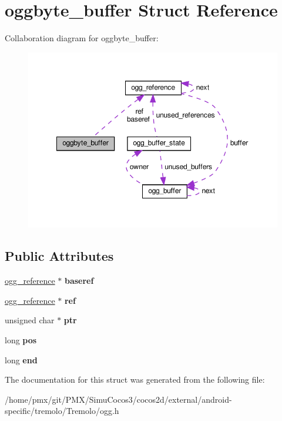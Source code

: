\hypertarget{structoggbyte__buffer}{}\section{oggbyte\+\_\+buffer Struct Reference}
\label{structoggbyte__buffer}


Collaboration diagram for oggbyte\+\_\+buffer\+:
\nopagebreak
\begin{figure}[H]
\begin{center}
\leavevmode
\includegraphics[width=349pt]{structoggbyte__buffer__coll__graph}
\end{center}
\end{figure}
\subsection*{Public Attributes}
\begin{DoxyCompactItemize}
\item 
\mbox{\label{structoggbyte__buffer_a4027963c31202b9ab202781028149549}} 
\hyperlink{structogg__reference}{ogg\+\_\+reference} $\ast$ {\bfseries baseref}
\item 
\mbox{\label{structoggbyte__buffer_ab1fc2a28a18a9be62c62953eb28df45a}} 
\hyperlink{structogg__reference}{ogg\+\_\+reference} $\ast$ {\bfseries ref}
\item 
\mbox{\label{structoggbyte__buffer_ad23083260315477a9f977c40cbd6106c}} 
unsigned char $\ast$ {\bfseries ptr}
\item 
\mbox{\label{structoggbyte__buffer_af192cdd1f7f4aa73188c31f092cf7cc3}} 
long {\bfseries pos}
\item 
\mbox{\label{structoggbyte__buffer_ae00d295abe502d19c03f64c04433e2fc}} 
long {\bfseries end}
\end{DoxyCompactItemize}


The documentation for this struct was generated from the following file\+:\begin{DoxyCompactItemize}
\item 
/home/pmx/git/\+P\+M\+X/\+Simu\+Cocos3/cocos2d/external/android-\/specific/tremolo/\+Tremolo/ogg.\+h\end{DoxyCompactItemize}

